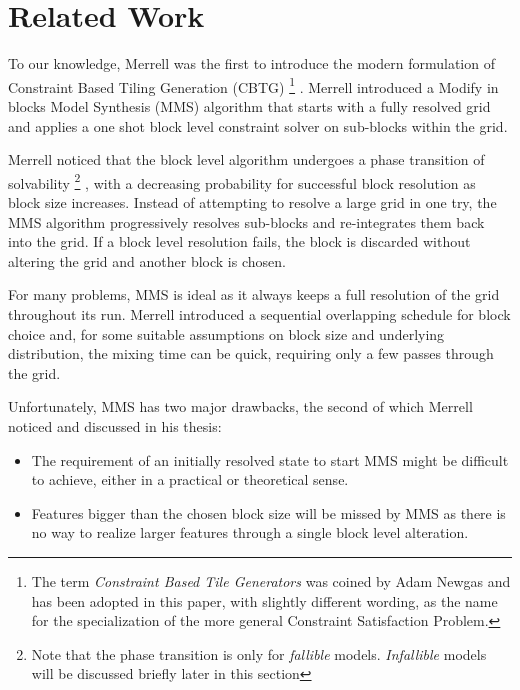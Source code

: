 \section{Related Work}

To our knowledge, Merrell was the first to introduce the modern formulation of Constraint Based Tiling Generation (CBTG)
\footnote{The term \textit{Constraint Based Tile Generators} was coined by Adam Newgas \cite{BorisTheBrave_cbtg_2021} and has been adopted in this paper,
with slightly different wording, as the name for the specialization of the more general Constraint Satisfaction Problem.}
\cite{Merrell_2007, Merrell_2009}.
Merrell introduced a Modify in blocks Model Synthesis (MMS) algorithm that starts with a fully resolved grid
and applies a one shot block level constraint solver on sub-blocks within the grid.

Merrell noticed that the block level algorithm undergoes a phase transition of solvability
\footnote{ Note that the phase transition is only for \textit{fallible} models. \textit{Infallible} models will be discussed briefly later in this section }
, with a decreasing probability
for successful block resolution as block size increases.
Instead of attempting to resolve a large grid in one try, the MMS algorithm progressively resolves sub-blocks and re-integrates them back into the grid.
If a block level resolution fails, the block is discarded without altering the grid and another block is chosen.

For many problems, MMS is ideal as it always keeps a full resolution of the grid throughout its run.
Merrell introduced a sequential overlapping schedule for block choice and, for some suitable assumptions
on block size and underlying distribution, the mixing time can be quick, requiring only a few passes through the grid.

Unfortunately, MMS has two major drawbacks, the second of which Merrell noticed and discussed in his thesis:

\begin{itemize}
  \item The requirement of an initially resolved state to start MMS might be difficult to achieve, either in a practical
        or theoretical sense.
  \item Features bigger than the chosen block size will be missed by MMS as there is no way to realize larger features
        through a single block level alteration.
\end{itemize}

